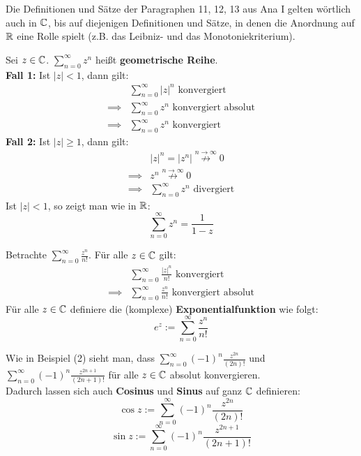 \documentclass[a4paper,oneside,DIV15,BCOR12mm,chapterprefix=true,headings=onelinechapter]{scrbook}
\begin{document}
Die Definitionen und Sätze der Paragraphen 11, 12, 13 aus Ana I gelten wörtlich
auch in $\mathbb{C}$, bis auf diejenigen Definitionen und Sätze, in denen die Anordnung
auf $\mathbb{R}$ eine Rolle spielt (z.B. das Leibniz- und das Monotoniekriterium).
\\
\begin{beispiele}
\item Sei $z\in\mathbb{C}$. $\sum_{n=0}^{\infty} z^n$ heißt \textbf{geometrische Reihe}.\\
\textbf{Fall 1:} Ist $|z|< 1$, dann gilt:
\begin{align*}
&\sum_{n=0}^{\infty} |z|^n \text{ konvergiert}\\
\implies &\sum_{n=0}^{\infty} z^n\text{ konvergiert absolut}\\
\implies &\sum_{n=0}^{\infty} z^n\text{ konvergiert}
\end{align*}
\textbf{Fall 2:} Ist $|z|\ge 1$, dann gilt:
\begin{align*}
&|z|^n=|z^n|\stackrel{n\to\infty}{\not\to} 0\\
\implies &z^n\stackrel{n\to\infty}{\not\to} 0\\
\implies &\sum_{n=0}^{\infty} z^n \text{ divergiert}
\end{align*}
Ist $|z|<1$, so zeigt man wie in $\mathbb{R}$:
\[\sum_{n=0}^{\infty} z^n= \frac1{1-z}\]
\item Betrachte $\sum_{n=0}^\infty \frac{z^n}{n!}$. Für alle $z\in\mathbb{C}$ gilt:
\begin{align*}
&\sum_{n=0}^\infty \frac{|z|^n}{n!} \text{ konvergiert}\\
\implies &\sum_{n=0}^\infty \frac{z^n}{n!} \text{ konvergiert absolut}
\end{align*}
Für alle $z\in\mathbb{C}$ definiere die (komplexe) \textbf{Exponentialfunktion} wie folgt:
\[e^z:=\sum_{n=0}^\infty\frac{z^n}{n!}\]
\item Wie in Beispiel (2) sieht man, dass $\sum_{n=0}^\infty (-1)^n \frac{z^{2n}}{(2n)!}$ und
$\sum_{n=0}^\infty (-1)^n \frac{z^{2n+1}}{(2n+1)!}$ für alle $z\in\mathbb{C}$ absolut konvergieren.\\
Dadurch lassen sich auch \textbf{Cosinus} und \textbf{Sinus} auf ganz $\mathbb{C}$ definieren:
\[\cos{z}:=\sum_{n=0}^\infty (-1)^n\frac{z^{2n}}{(2n)!}\]
\[\sin{z}:=\sum_{n=0}^\infty (-1)^n\frac{z^{2n+1}}{(2n+1)!}\]
\end{beispiele}
\end{document}
